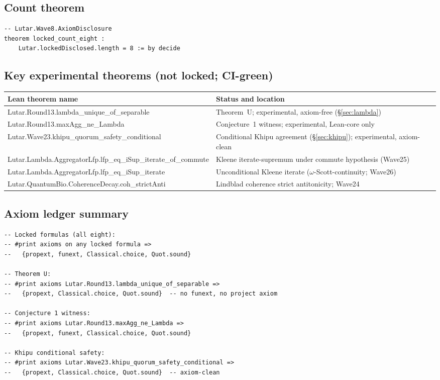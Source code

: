 \documentclass[11pt,letterpaper]{article}
\newcommand{\lean}[1]{{\small\ttfamily #1}}
\newcommand{\lb}{\discretionary{}{}{}}
\theoremstyle{definition}
\begin{document}
\subsection{Count theorem}

\begin{lstlisting}
-- Lutar.Wave8.AxiomDisclosure
theorem locked_count_eight :
    Lutar.lockedDisclosed.length = 8 := by decide
\end{lstlisting}

\subsection{Key experimental theorems (not locked; CI-green)}

\begin{center}\small
\begin{tabular}{@{}p{4.5cm}p{7.5cm}@{}}
\toprule
\textbf{Lean theorem name} & \textbf{Status and location} \\
\midrule
\lean{Lutar.\lb Round13.\lb lambda\_\lb unique\_\lb of\_\lb separable}
  & Theorem~U; experimental, axiom-free (\S\ref{sec:lambda}) \\
\lean{Lutar.\lb Round13.\lb maxAgg\_\lb ne\_\lb Lambda}
  & Conjecture~1 witness; experimental, Lean-core only \\
\lean{Lutar.\lb Wave23.\lb khipu\_\lb quorum\_\lb safety\_\lb conditional}
  & Conditional Khipu agreement (\S\ref{sec:khipu}); experimental, axiom-clean \\
\lean{Lutar.\lb Lambda.\lb AggregatorLfp.\lb lfp\_\lb eq\_\lb iSup\_\lb iterate\_\lb of\_\lb commute}
  & Kleene iterate-supremum under commute hypothesis (Wave25) \\
\lean{Lutar.\lb Lambda.\lb AggregatorLfp.\lb lfp\_\lb eq\_\lb iSup\_\lb iterate}
  & Unconditional Kleene iterate ($\omega$-Scott-continuity; Wave26) \\
\lean{Lutar.\lb QuantumBio.\lb CoherenceDecay.\lb coh\_\lb strictAnti}
  & Lindblad coherence strict antitonicity; Wave24 \\
\bottomrule
\end{tabular}
\end{center}

\subsection{Axiom ledger summary}

\begin{lstlisting}
-- Locked formulas (all eight):
-- #print axioms on any locked formula =>
--   {propext, funext, Classical.choice, Quot.sound}

-- Theorem U:
-- #print axioms Lutar.Round13.lambda_unique_of_separable =>
--   {propext, Classical.choice, Quot.sound}  -- no funext, no project axiom

-- Conjecture 1 witness:
-- #print axioms Lutar.Round13.maxAgg_ne_Lambda =>
--   {propext, funext, Classical.choice, Quot.sound}

-- Khipu conditional safety:
-- #print axioms Lutar.Wave23.khipu_quorum_safety_conditional =>
--   {propext, Classical.choice, Quot.sound}  -- axiom-clean
\end{lstlisting}
\end{document}
